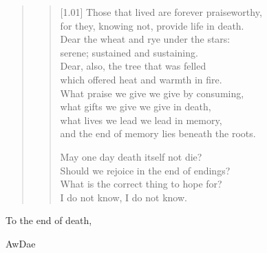 \begin{quote}
\begin{verse}[1.01\textwidth]
    Those that lived are forever praiseworthy,\\
    for they, knowing not, provide life in death.\\
    Dear the wheat and rye under the stars:\\
    serene; sustained and sustaining.\\
    Dear, also, the tree that was felled\\
    which offered heat and warmth in fire.\\
    What praise we give we give by consuming,\\
    what gifts we give we give in death,\\
    what lives we lead we lead in memory,\\
    and the end of memory lies beneath the roots.


    May one day death itself not die?\\
    Should we rejoice in the end of endings?\\
    What is the correct thing to hope for?\\
    I do not know, I do not know.
  \end{verse}

\end{quote}
To the end of death,

AwDae
